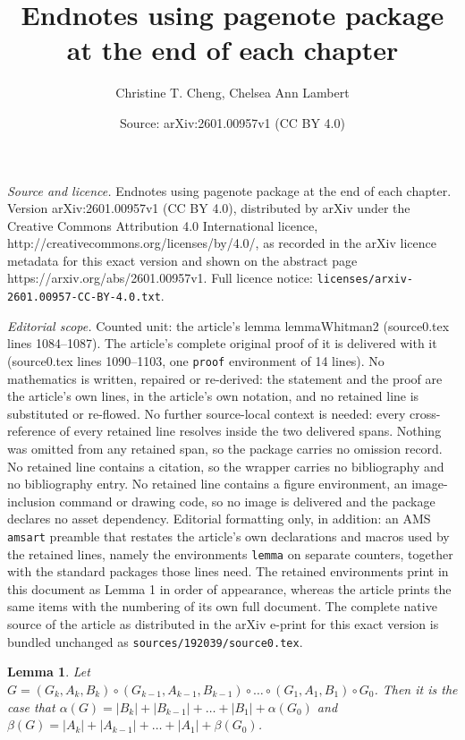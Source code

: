 \documentclass[10pt,a4paper]{amsart}
\title{Endnotes using pagenote package at the end of each chapter}
\author{Christine T. Cheng, Chelsea Ann Lambert}
\date{Source: arXiv:2601.00957v1 (CC BY 4.0)}
\newtheorem{lemma}{Lemma}
\begin{document}
\maketitle

\noindent\emph{Source and licence.} Endnotes using pagenote package at the end of each chapter. Version arXiv:2601.00957v1 (CC BY 4.0), distributed by arXiv under the Creative Commons Attribution 4.0 International licence, http://creativecommons.org/licenses/by/4.0/, as recorded in the arXiv licence metadata for this exact version and shown on the abstract page https://arxiv.org/abs/2601.00957v1. Full licence notice: \texttt{licenses/arxiv-2601.00957-CC-BY-4.0.txt}.\par\smallskip

\noindent\textit{Editorial scope.} Counted unit: the article's lemma lemmaWhitman2 (source0.tex lines 1084--1087). The article's complete original proof of it is delivered with it (source0.tex lines 1090--1103, one \texttt{proof} environment of 14 lines). No mathematics is written, repaired or re-derived: the statement and the proof are the article's own lines, in the article's own notation, and no retained line is substituted or re-flowed.  No further source-local context is needed: every cross-reference of every retained line resolves inside the two delivered spans.  Nothing was omitted from any retained span, so the package carries no omission record.  No retained line contains a citation, so the wrapper carries no bibliography and no bibliography entry.  No retained line contains a figure environment, an image-inclusion command or drawing code, so no image is delivered and the package declares no asset dependency.  Editorial formatting only, in addition: an AMS \texttt{amsart} preamble that restates the article's own declarations and macros used by the retained lines, namely the environments \texttt{lemma} on separate counters, together with the standard packages those lines need.  The retained environments print in this document as Lemma 1 in order of appearance, whereas the article prints the same items with the numbering of its own full document.  The complete native source of the article as distributed in the arXiv e-print for this exact version is bundled unchanged as \texttt{sources/192039/source0.tex}.
\begin{lemma}
Let $G= (G_k , A_k, B_k) \circ (G_{k-1}, A_{k-1}, B_{k-1})  \circ \hdots \circ (G_1, A_1, B_1) \circ G_0$. Then it is the case that $\alpha(G) = |B_k| + |B_{k-1}|+ \hdots + |B_1| + \alpha(G_0)$ and $\beta(G) = |A_k| + |A_{k-1}|+ \hdots + |A_1| + \beta(G_0)$.
\label{lemmaWhitman2}
\end{lemma}
\end{document}
